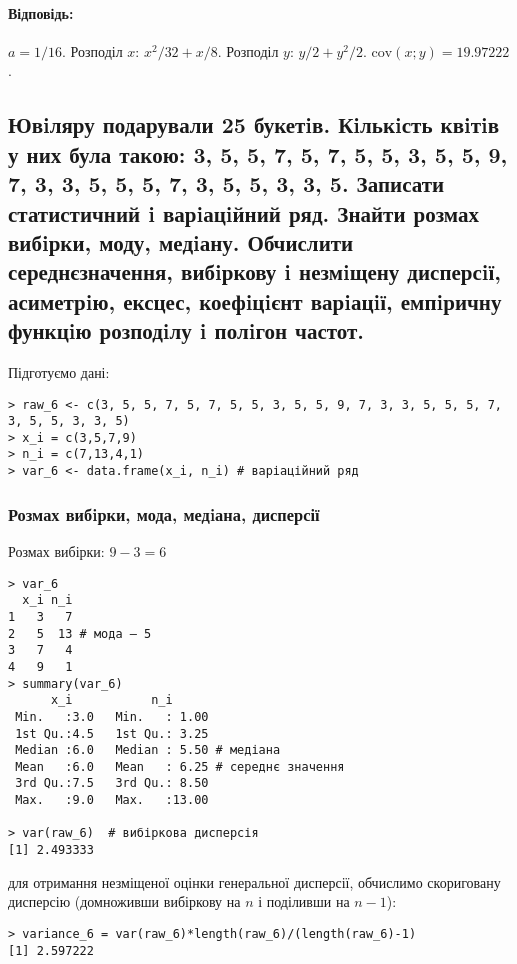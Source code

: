 \documentclass[a4paper, 12pt, oneside]{extarticle}
\newcommand{\Problem}{\subsection}
\newcommand{\Answer}[1]{
\medskip
\null\hfill
\begin{boxedminipage}{\textwidth}
	\paragraph{Відповідь: }{#1}
\end{boxedminipage}
}
\begin{document}
\fboxrule=1pt

\Answer{
$a=1/16$.
Розподіл $x$: $x^2/32 + x/8$.
Розподіл $y$: $y/2 + y^2/2$.
$\text{cov}(x;y) = 19.97222$.
}

\Problem{
Ювiляру подарували 25 букетiв. Кiлькiсть квiтiв у них була такою: 3, 5, 5, 7, 5, 7, 5, 5,
3, 5, 5, 9, 7, 3, 3, 5, 5, 5, 7, 3, 5, 5, 3, 3, 5. Записати статистичний i варiацiйний ряд.
Знайти
розмах вибiрки,
моду,
медiану.
Обчислити
середнєзначення,
вибiркову i незмiщену
дисперсiї,
асиметрiю,
ексцес,
коефiцiєнт варiацiї,
емпiричну функцiю розподiлу
i полiгон частот.
}

Підготуємо дані:
\begin{verbatim}
> raw_6 <- c(3, 5, 5, 7, 5, 7, 5, 5, 3, 5, 5, 9, 7, 3, 3, 5, 5, 5, 7, 3, 5, 5, 3, 3, 5)
> x_i = c(3,5,7,9)
> n_i = c(7,13,4,1)
> var_6 <- data.frame(x_i, n_i) # варіаційний ряд
\end{verbatim}

\subsubsection{Розмах вибiрки, мода, медiана, дисперсії}

Розмах вибірки: $9-3 = 6$

\begin{verbatim}
> var_6
  x_i n_i
1   3   7
2   5  13 # мода — 5
3   7   4
4   9   1
> summary(var_6)
      x_i           n_i
 Min.   :3.0   Min.   : 1.00
 1st Qu.:4.5   1st Qu.: 3.25
 Median :6.0   Median : 5.50 # медіана
 Mean   :6.0   Mean   : 6.25 # середнє значення
 3rd Qu.:7.5   3rd Qu.: 8.50
 Max.   :9.0   Max.   :13.00

> var(raw_6)  # вибіркова дисперсія
[1] 2.493333
\end{verbatim}

для отримання незміщеної оцінки генеральної дисперсії,
обчислимо скориговану дисперсію (домноживши вибіркову на $n$ і поділивши на $n-1$):

\begin{verbatim}
> variance_6 = var(raw_6)*length(raw_6)/(length(raw_6)-1)
[1] 2.597222
\end{verbatim}
\end{document}
